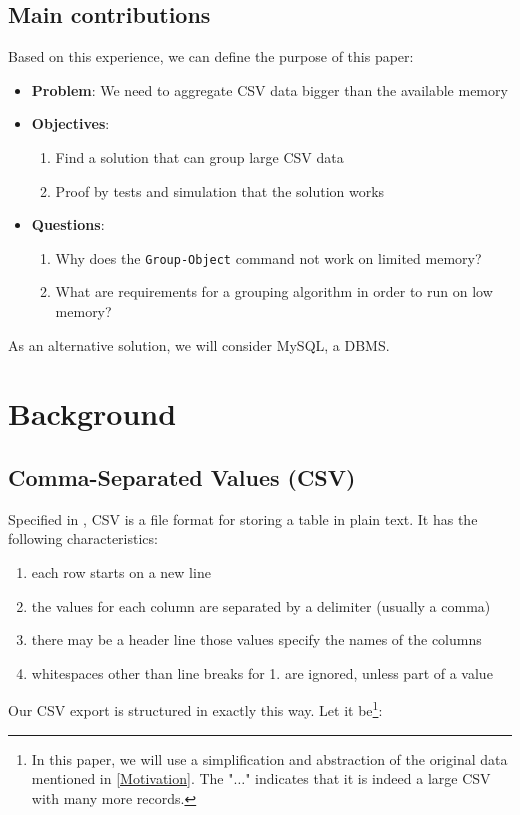 \subsection{Main contributions}
Based on this experience, we can define the purpose of this paper:
\begin{itemize}
    \item \textbf{Problem}: We need to aggregate CSV data bigger than the available memory
    \item \textbf{Objectives}:
    \begin{enumerate}
        \item Find a solution that can group large CSV data
        \item Proof by tests and simulation that the solution works
    \end{enumerate}
    \item \textbf{Questions}:
    \begin{enumerate}
        \item Why does the \verb+Group-Object+ command not work on limited memory?
        \item What are requirements for a grouping algorithm in order to run on low memory?
    \end{enumerate}
\end{itemize}
As an alternative solution, we will consider MySQL, a \gls{DBMS}.

\newpage
\section{Background}

\subsection{Comma-Separated Values (CSV)}

Specified in \cite{rfc4180}, CSV is a file format for storing a table in plain text.
It has the following characteristics:

\begin{enumerate}
    \item each row starts on a new line
    \item the values for each column are separated by a delimiter (usually a comma)
    \item there may be a header line those values specify the names of the columns
    \item whitespaces other than line breaks for 1. are ignored, unless part of a value
\end{enumerate}
Our CSV export is structured in exactly this way. Let it be\footnote{
In this paper, we will use a simplification and abstraction of the original
data mentioned in \ref{Motivation}. The "$\dots$" indicates that
it is indeed a large CSV with many more records.}:

